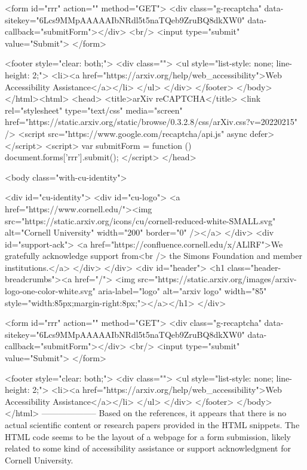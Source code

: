        <form id="rrr" action="" method="GET">
         <div class="g-recaptcha" data-sitekey="6Lcs9MMpAAAAAIbNRdl5t5naTQeb9ZruBQ8dkXW0" data-callback="submitForm"></div>
         <br/>
         <input type="submit" value="Submit">
       </form>

       <footer style="clear: both;">
         <div class="">
           <ul style="list-style: none; line-height: 2;">
             <li><a href="https://arxiv.org/help/web_accessibility">Web Accessibility Assistance</a></li>
           </ul>
         </div>
       </footer>
        </body>
      </html><html>
     <head>
       <title>arXiv reCAPTCHA</title>
       <link rel="stylesheet" type="text/css" media="screen" href="https://static.arxiv.org/static/browse/0.3.2.8/css/arXiv.css?v=20220215" />
       <script src="https://www.google.com/recaptcha/api.js" async defer></script>
       <script>
         var submitForm = function () {
             document.forms['rrr'].submit();
         }
       </script>
     </head>

     <body class="with-cu-identity">

       <div id="cu-identity">
         <div id="cu-logo">
           <a href="https://www.cornell.edu/"><img src="https://static.arxiv.org/icons/cu/cornell-reduced-white-SMALL.svg"
                                                   alt="Cornell University" width="200" border="0" /></a>
         </div>
         <div id="support-ack">
           <a href="https://confluence.cornell.edu/x/ALlRF">We gratefully acknowledge support from<br />
             the Simons Foundation and member institutions.</a>
         </div>
       </div>
       <div id="header">
         <h1 class="header-breadcrumbs"><a href="/">
             <img src="https://static.arxiv.org/images/arxiv-logo-one-color-white.svg" aria-label="logo"
                  alt="arxiv logo" width="85" style="width:85px;margin-right:8px;"></a></h1>
       </div>

       <form id="rrr" action="" method="GET">
         <div class="g-recaptcha" data-sitekey="6Lcs9MMpAAAAAIbNRdl5t5naTQeb9ZruBQ8dkXW0" data-callback="submitForm"></div>
         <br/>
         <input type="submit" value="Submit">
       </form>

       <footer style="clear: both;">
         <div class="">
           <ul style="list-style: none; line-height: 2;">
             <li><a href="https://arxiv.org/help/web_accessibility">Web Accessibility Assistance</a></li>
           </ul>
         </div>
       </footer>
        </body>
      </html>
        --------------------
         Based on the references, it appears that there is no actual scientific content or research papers provided in the HTML snippets. The HTML code seems to be the layout of a webpage for a form submission, likely related to some kind of accessibility assistance or support acknowledgment for Cornell University.

